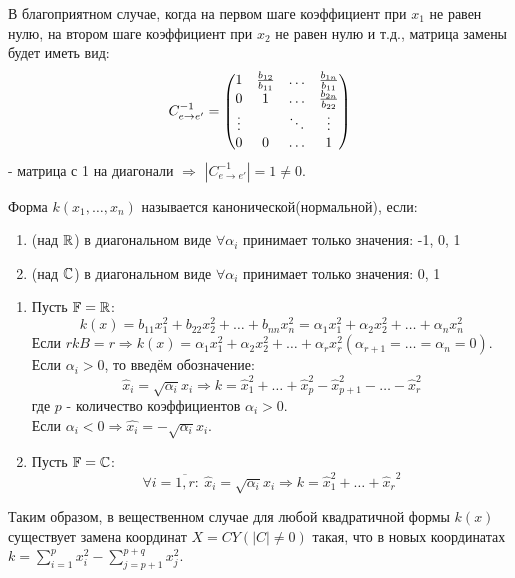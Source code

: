 \begin{remark}
    В благоприятном случае, когда на первом шаге коэффициент при $x_1$ не равен нулю, на втором шаге коэффициент при $x_2$ не равен нулю и т.д., матрица замены будет иметь вид:
    $$C_{e\rightarrow e'}^{-1}=\begin{pmatrix}
    1 & \frac{b_{12}}{b_{11}} & \ldots & \frac{b_{1n}}{b_{11}}\\
    0 & 1 & \ldots & \frac{b_{2n}}{b_{22}}\\
    \vdots & \null & \ddots & \vdots\\
    0 & 0 & \ldots & 1
    \end{pmatrix}$$ 
    - матрица с 1 на диагонали $\Longrightarrow$ $|C_{e\rightarrow e'}^{-1}|=1\neq0$.
\end{remark}
\begin{definition}
    Форма $k(x_1,\ldots,x_n)$ называется канонической(нормальной), если:
    \begin{enumerate}
        \item (над $\mathbb{R}$) в диагональном виде $\forall \alpha_i$ принимает только значения: -1, 0, 1
        \item (над $\mathbb{C}$) в диагональном виде $\forall \alpha_i$ принимает только значения: 0, 1
    \end{enumerate}
\end{definition}
\begin{example}\tab
    \begin{enumerate}
        \item Пусть $\mathbb{F}=\mathbb{R}$:
        $$k(x)=b_{11}x_1^2+b_{22}x_2^2+\ldots+b_{nn}x_n^2 = \alpha_1x_1^2+\alpha_2x_2^2+\ldots+\alpha_nx_n^2$$
        Если $rkB=r \Longrightarrow  k(x)=\alpha_1x_1^2+\alpha_2x_2^2+\ldots+\alpha_rx_r^2(\alpha_{r+1}=\ldots=\alpha_n=0)$.\\
        Если $\alpha_i>0$, то введём обозначение: 
        $$\widehat{x}_i=\sqrt{\alpha_i}x_i \Longrightarrow k=\widehat{x}_1^2+\ldots+\widehat{x}_p^2-\widehat{x}_{p+1}^2-\ldots-\widehat{x}_r^2$$
        где $p$ - количество коэффициентов $\alpha_i>0$.\\
        Если $\alpha_i < 0 \Longrightarrow  \widehat{x_i} = -\sqrt{\alpha_i}x_i$.
        \item Пусть $\mathbb{F}=\mathbb{C}$: 
        $$\forall i=\overline{1,r}: \ \widehat{x}_i=\sqrt{\alpha_i}x_i \Longrightarrow k=\widehat{x}_1^2+\ldots+{\widehat{x}_r}^2$$
    \end{enumerate}
\end{example}
Таким образом, в вещественном случае для любой квадратичной формы $k(x)$ существует замена координат $X = CY (|C| \neq 0)$ такая, что в новых координатах $k = \sum \limits_{i=1}^p x_i^2 - \sum \limits_{j=p+1}^{p+q} x_j^2$.
